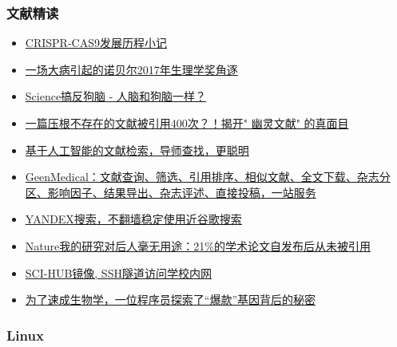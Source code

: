 \documentclass[]{article}
\providecommand{\tightlist}{%
  \setlength{\itemsep}{0pt}\setlength{\parskip}{0pt}}
\numberwithin{figure}{section}
\numberwithin{table}{section}
\begin{document}
\hypertarget{ux6587ux732eux7cbeux8bfb}{%
\subsubsection{文献精读}\label{ux6587ux732eux7cbeux8bfb}}

\begin{itemize}
\tightlist
\item
  \href{http://mp.weixin.qq.com/s/brx-i-Bbgp-XYwn5SkQLwA}{CRISPR-CAS9发展历程小记}
\item
  \href{http://mp.weixin.qq.com/s/T9Q6CUCt-wBoUCEwSBZALg}{一场大病引起的诺贝尔2017年生理学奖角逐}
\item
  \href{https://mp.weixin.qq.com/s/zymhxusKNDZ9XynNGAlRcA}{Science搞反狗脑 - 人脑和狗脑一样？}
\item
  \href{http://mp.weixin.qq.com/s/OgAhb_UGUp7tZvQARbmLLg}{一篇压根不存在的文献被引用400次？！揭开" 幽灵文献" 的真面目}
\item
  \href{http://mp.weixin.qq.com/s/ikU0mVyX6BQNgljD1jCrRA}{基于人工智能的文献检索，导师查找，更聪明}
\item
  \href{http://mp.weixin.qq.com/s/hc8g64aHN7qv8YhVfrsuvQ}{GeenMedical：文献查询、筛选、引用排序、相似文献、全文下载、杂志分区、影响因子、结果导出、杂志评述、直接投稿，一站服务}
\item
  \href{http://mp.weixin.qq.com/s/fZ2Nm7Wck5mZLiESHcPusA}{YANDEX搜索，不翻墙稳定使用近谷歌搜索}
\item
  \href{http://mp.weixin.qq.com/s/NMpqbKfXy002eMz9b9y1zg}{Nature我的研究对后人毫无用途：21\%的学术论文自发布后从未被引用}
\item
  \href{https://mp.weixin.qq.com/s/NGsFlVb0fN1O37ecaYwxsA}{SCI-HUB镜像, SSH隧道访问学校内网}
\item
  \href{http://mp.weixin.qq.com/s/fFO6MX6Ttijx0bfYS5eQ-Q}{为了速成生物学，一位程序员探索了``爆款''基因背后的秘密}
\end{itemize}

\hypertarget{linux}{%
\subsubsection{Linux}\label{linux}}
\end{document}
